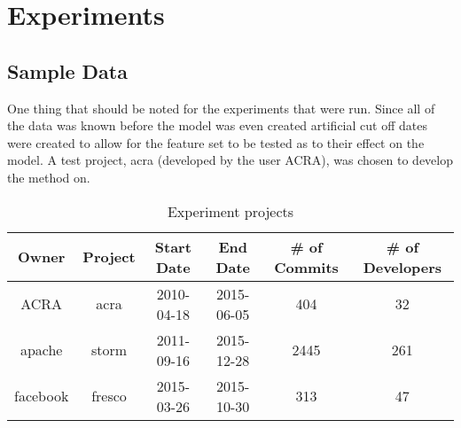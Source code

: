\chapter{Experiments}
\label{chap:experiments}

\section{Sample Data}
\label{sec:sample_data}


One thing that should be noted for the experiments that were run. Since all of the data was known before the model was even created artificial cut off dates were created to allow for the feature set to be tested as to their effect on the model. A test project, acra (developed by the user ACRA), was chosen to develop the method on. 


\begin{table}
\begin{center}
    \begin{tabular}{|c|c|c|c|c|c|}
        \hline
        Owner & Project & Start Date & End Date & \# of Commits & \# of Developers \\
        \hline
        ACRA & acra & 2010-04-18 & 2015-06-05 & 404 & 32 \\
        apache & storm & 2011-09-16 & 2015-12-28 & 2445 & 261 \\
        facebook & fresco & 2015-03-26 & 2015-10-30 & 313 & 47 \\
        \hline
    \end{tabular}
\end{center}
\caption{Experiment projects}
\label{tab:project_summary}
\end{table}


